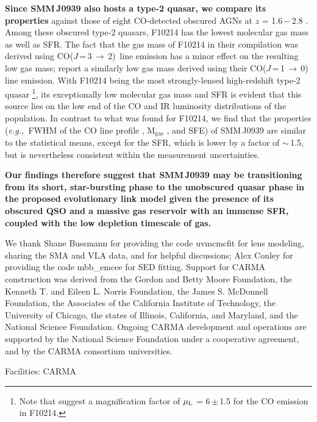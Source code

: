 \documentclass[iop, revtex4]{emulateapj}
\newcommand{\rarr}{$\rightarrow$}
\newcommand{\CO}{\mbox{CO($J$\,=\,3\,$\rightarrow$\,2) }}
\newcommand{\eg}{{\sl e.g.,~}}
\begin{document}
{\bf Since SMM\,J0939 also hosts a type-2 quasar, we compare its properties}
against those of eight CO-detected obscured AGNs at $z$ = 1.6\,$-$\,2.8 \citep[][and references
therein]{Polletta11a}. 
Among these obscured type-2 quasars, F10214 has the lowest molecular gas mass as well as SFR. The fact that the gas mass of F10214 in their compilation was derived using \CO line emission \citep{Solomon05a} has a minor effect on the resulting low gas mass; \citet{Riechers11a} report
a similarly low gas mass derived using their CO($J$\,=\,1\,\rarr\,0) line emission.
With F10214 being the most strongly-lensed high-redshift type-2 quasar \citep[$\mu_{\textrm L}$ = 17; ][]{Solomon05a}\footnote{Note that \citet{Deane13a} suggest a magnification factor of $\mu_{\textrm L}$ = 6\,$\pm$\,1.5 for the CO emission in F10214.}, its exceptionally low molecular gas mass and SFR is evident that this source lies on the low end of the CO and IR luminosity distributions of the population.
In contrast to what was found for F10214, we find that the properties
(\eg FWHM of the CO line profile 
, M$_\textrm{gas}$
, and SFE) of SMM\,J0939 are similar to the statistical means, except for the SFR, which is lower by a
factor of $\sim$\,1.5, but is nevertheless consistent within the measurement uncertainties. 


{\bf Our findings therefore suggest that SMM\,J0939 {\bf may be} transitioning from its short, star-bursting phase to the unobscured quasar phase in the proposed evolutionary link model \citep[\eg][]{Sanders88,Coppin08a,Simpson12a} given the presence of its obscured QSO and a massive gas reservoir with an immense SFR, coupled with the low depletion timescale of gas. }

\begin{acknowledgments}
We thank Shane Bussmann for providing the code {\sc uvmcmcfit} for lens modeling, sharing the SMA and VLA data, and for helpful discussions; Alex Conley for providing the code {\sc mbb\_emcee} for SED fitting. 
Support for CARMA construction was derived from the
Gordon and Betty Moore Foundation, the Kenneth T. and Eileen
L. Norris Foundation, the James S. McDonnell Foundation, the
Associates of the California Institute of Technology, the University
of Chicago, the states of Illinois, California, and Maryland,
and the National Science Foundation. 
Ongoing CARMA development
and operations are supported by the National Science
Foundation under a cooperative agreement, and by the CARMA
consortium universities.

Facilities: CARMA
\end{acknowledgments}
\end{document}

